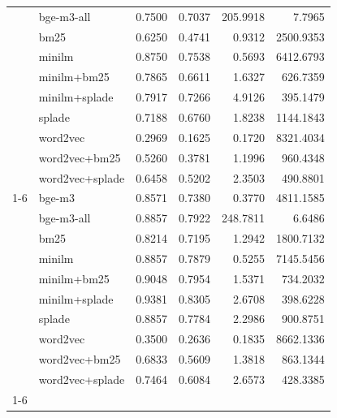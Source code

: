 \begin{table}
\begin{tabular}{llrrrr}
 & bge-m3-all & 0.7500 & 0.7037 & 205.9918 & 7.7965 \\
 & bm25 & 0.6250 & 0.4741 & 0.9312 & 2500.9353 \\
 & minilm & 0.8750 & 0.7538 & 0.5693 & 6412.6793 \\
 & minilm+bm25 & 0.7865 & 0.6611 & 1.6327 & 626.7359 \\
 & minilm+splade & 0.7917 & 0.7266 & 4.9126 & 395.1479 \\
 & splade & 0.7188 & 0.6760 & 1.8238 & 1144.1843 \\
 & word2vec & 0.2969 & 0.1625 & 0.1720 & 8321.4034 \\
 & word2vec+bm25 & 0.5260 & 0.3781 & 1.1996 & 960.4348 \\
 & word2vec+splade & 0.6458 & 0.5202 & 2.3503 & 490.8801 \\
\cline{1-6}
\multirow[t]{10}{*}{scifact} & bge-m3 & 0.8571 & 0.7380 & 0.3770 & 4811.1585 \\
 & bge-m3-all & 0.8857 & 0.7922 & 248.7811 & 6.6486 \\
 & bm25 & 0.8214 & 0.7195 & 1.2942 & 1800.7132 \\
 & minilm & 0.8857 & 0.7879 & 0.5255 & 7145.5456 \\
 & minilm+bm25 & 0.9048 & 0.7954 & 1.5371 & 734.2032 \\
 & minilm+splade & 0.9381 & 0.8305 & 2.6708 & 398.6228 \\
 & splade & 0.8857 & 0.7784 & 2.2986 & 900.8751 \\
 & word2vec & 0.3500 & 0.2636 & 0.1835 & 8662.1336 \\
 & word2vec+bm25 & 0.6833 & 0.5609 & 1.3818 & 863.1344 \\
 & word2vec+splade & 0.7464 & 0.6084 & 2.6573 & 428.3385 \\
\cline{1-6}
\bottomrule
\end{tabular}
\end{table}
